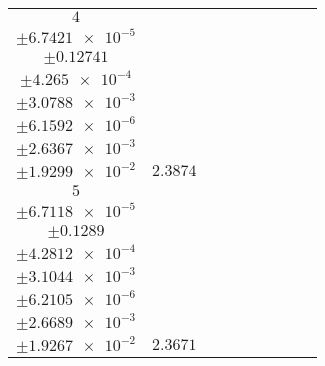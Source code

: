 \documentclass[8pt]{article}
\begin{document}
\begin{longtable}[l]{c c c c c c c c c}
$\num{4}$ & \begin{tabular}[c]{@{}c@{}}$\num{3.0731e-2}$ \\ $\pm\num{6.7421e-5}$\end{tabular} & \begin{tabular}[c]{@{}c@{}}$\num{-5.3767e-2}$ \\ $\pm\num{0.12741}$\end{tabular} & \begin{tabular}[c]{@{}c@{}}$\num{-4.9841}$ \\ $\pm\num{4.265e-4}$\end{tabular} & \begin{tabular}[c]{@{}c@{}}$\num{725.69}$ \\ $\pm\num{3.0788e-3}$\end{tabular} & \begin{tabular}[c]{@{}c@{}}$\num{1.4518}$ \\ $\pm\num{6.1592e-6}$\end{tabular} & \begin{tabular}[c]{@{}c@{}}$\num{1.1658}$ \\ $\pm\num{2.6367e-3}$\end{tabular} & \begin{tabular}[c]{@{}c@{}}$\num{4.176}$ \\ $\pm\num{1.9299e-2}$\end{tabular} & $\num{2.3874}$\\
$\num{5}$ & \begin{tabular}[c]{@{}c@{}}$\num{3.0256e-2}$ \\ $\pm\num{6.7118e-5}$\end{tabular} & \begin{tabular}[c]{@{}c@{}}$\num{0.3603}$ \\ $\pm\num{0.1289}$\end{tabular} & \begin{tabular}[c]{@{}c@{}}$\num{4.9818}$ \\ $\pm\num{4.2812e-4}$\end{tabular} & \begin{tabular}[c]{@{}c@{}}$\num{735.67}$ \\ $\pm\num{3.1044e-3}$\end{tabular} & \begin{tabular}[c]{@{}c@{}}$\num{1.4717}$ \\ $\pm\num{6.2105e-6}$\end{tabular} & \begin{tabular}[c]{@{}c@{}}$\num{1.166}$ \\ $\pm\num{2.6689e-3}$\end{tabular} & \begin{tabular}[c]{@{}c@{}}$\num{4.0521}$ \\ $\pm\num{1.9267e-2}$\end{tabular} & $\num{2.3671}$\\

\end{longtable}
\end{document}
